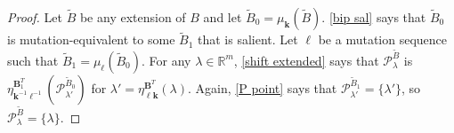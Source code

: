 \documentclass{amsart}
\theoremstyle{definition}
\theoremstyle{remark}
\numberwithin{equation}{section}
\newcommand{\reals}{\mathbb R}
\newcommand{\edge}{\,\,\rule[2.7pt]{20pt}{0.5pt}\,\,}
\newcommand{\set}[1]{{\lbrace #1 \rbrace}}
\newcommand{\0}{{\mathbf{0}}}
\newcommand{\Cone}{\mathrm{Cone}}
\newcommand{\kk}{{\boldsymbol{k}}}
\renewcommand{\ll}{{\boldsymbol\ell}}
\newcommand{\tB}{{\tilde{B}}}
\newcommand{\BB}{\mathbf{B}}
\renewcommand{\P}{\mathcal{P}}
\renewcommand{\d}{{\mathfrak d}}
\newcommand{\margin}[1]{\say[N]{#1}}
\begin{document}
\begin{proof}
Let $\tB$ be any extension of $B$ and let $\tB_0=\mu_\kk(\tB)$.
\cref{bip sal} says that $\tB_0$ is mutation-equivalent to some $\tB_1$ that is salient.
Let $\ll$ be a mutation sequence such that $\tB_1=\mu_\ll(\tB_0)$.
For any $\lambda\in\reals^m$, \cref{shift extended} says that $\P_\lambda^\tB$ is $\eta_{\kk^{-1}\ll^{-1}}^{\BB_1^T}(\P_{\lambda'}^{\tB_0})$ for $\lambda'=\eta_{\ll\kk}^{\BB^T}(\lambda)$.
Again, \cref{P point} says that $\P_{\lambda'}^{\tB_1}=\set{\lambda'}$, so $\P_\lambda^\tB=\set{\lambda}$.
\end{proof}

%
%
%
\end{document}
